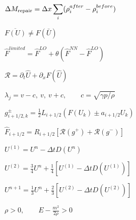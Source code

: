 \documentclass{article}
\begin{document}
\begin{preview}
\hbox{
\color[HTML]{242424}\fontsize{21}{25.2}\selectfont
$\displaystyle \Delta M_{\rm repair}=\Delta x\sum_i(\rho_i^{after}-\rho_i^{before})$
}
\end{preview}
\begin{preview}
\hbox{
\color[HTML]{242424}\fontsize{30}{36.0}\selectfont
$\displaystyle \overline{F(U)}\ne F(\bar U)$
}
\end{preview}
\begin{preview}
\hbox{
\color[HTML]{242424}\fontsize{27}{32.4}\selectfont
$\displaystyle \widehat F^{limited}=\widehat F^{LO}+\theta\left(\widehat F^{NN}-\widehat F^{LO}\right)$
}
\end{preview}
\begin{preview}
\hbox{
\color[HTML]{242424}\fontsize{27}{32.4}\selectfont
$\displaystyle \mathscr R=\partial_t\widehat U+\partial_xF(\widehat U)$
}
\end{preview}
\begin{preview}
\hbox{
\color[HTML]{242424}\fontsize{24}{28.799999999999997}\selectfont
$\displaystyle \lambda_j=v-c,\ v,\ v+c,\qquad c=\sqrt{\gamma p/\rho}$
}
\end{preview}
\begin{preview}
\hbox{
\color[HTML]{242424}\fontsize{24}{28.799999999999997}\selectfont
$\displaystyle g^\pm_{i+1/2,k}=\tfrac12 L_{i+1/2}\left(F(U_k)\pm a_{i+1/2}U_k\right)$
}
\end{preview}
\begin{preview}
\hbox{
\color[HTML]{242424}\fontsize{24}{28.799999999999997}\selectfont
$\displaystyle \widehat F_{i+1/2}=R_{i+1/2}\left[\mathcal R(g^+)+\mathcal R(g^-)\right]$
}
\end{preview}
\begin{preview}
\hbox{
\color[HTML]{242424}\fontsize{25}{30.0}\selectfont
$\displaystyle U^{(1)}=U^n-\Delta tD(U^n)$
}
\end{preview}
\begin{preview}
\hbox{
\color[HTML]{242424}\fontsize{24}{28.799999999999997}\selectfont
$\displaystyle U^{(2)}=\tfrac34U^n+\tfrac14\left[U^{(1)}-\Delta tD(U^{(1)})\right]$
}
\end{preview}
\begin{preview}
\hbox{
\color[HTML]{242424}\fontsize{24}{28.799999999999997}\selectfont
$\displaystyle U^{n+1}=\tfrac13U^n+\tfrac23\left[U^{(2)}-\Delta tD(U^{(2)})\right]$
}
\end{preview}
\begin{preview}
\hbox{
\color[HTML]{242424}\fontsize{25}{30.0}\selectfont
$\displaystyle \rho>0,\qquad E-\frac{m^2}{2\rho}>0$
}
\end{preview}
\end{document}
